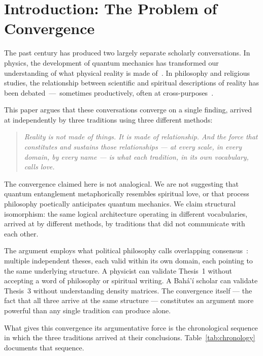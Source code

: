 
\section{Introduction: The Problem of Convergence}
\label{sec:intro}

The past century has produced two largely separate scholarly conversations.
In physics, the development of quantum mechanics has transformed our
understanding of what physical reality is made of~\citep{Rovelli2021,Bohm1980}.
In philosophy and religious studies, the relationship between scientific and
spiritual descriptions of reality has been debated~---~sometimes productively,
often at cross-purposes~\citep{Barbour2000,Polkinghorne1998}.

This paper argues that these conversations converge on a single finding,
arrived at independently by three traditions using three different methods:
\begin{quote}
\textit{Reality is not made of things. It is made of relationship. And the
force that constitutes and sustains those relationships --- at every scale,
in every domain, by every name --- is what each tradition, in its own
vocabulary, calls love.}
\end{quote}

The convergence claimed here is not analogical.
We are not suggesting that quantum entanglement metaphorically resembles
spiritual love, or that process philosophy poetically anticipates quantum
mechanics.
We claim structural isomorphism: the same logical architecture operating
in different vocabularies, arrived at by different methods, by traditions
that did not communicate with each other.

The argument employs what political philosophy calls overlapping
consensus~\citep{Rawls1993}: multiple independent theses, each valid
within its own domain, each pointing to the same underlying structure.
A physicist can validate Thesis~1 without accepting a word of philosophy
or spiritual writing.
A Bahá'í scholar can validate Thesis~3 without understanding density matrices.
The convergence itself --- the fact that all three arrive at the same structure
--- constitutes an argument more powerful than any single tradition can produce alone.

What gives this convergence its argumentative force is the chronological
sequence in which the three traditions arrived at their conclusions.
Table~\ref{tab:chronology} documents that sequence.

